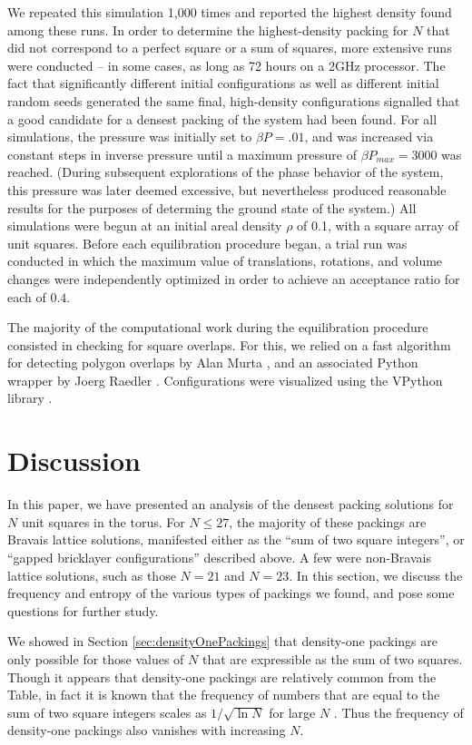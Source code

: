 \documentclass[aps]{revtex4}
\begin{document}
We repeated this simulation 1,000 times and reported the highest density found among these runs.  In order to determine the highest-density packing for $N$ that did not correspond to a perfect square or a sum of squares, more extensive runs were conducted -- in some cases, as long as 72 hours on a 2GHz processor.  The fact that significantly different initial configurations as well as different initial random seeds generated the same final, high-density configurations signalled that a good candidate for a densest packing of the system had been found.  For all simulations, the pressure was initially set to $\beta P=.01$, and was increased via constant steps in inverse pressure until a maximum pressure of $\beta P_{max}=3000$ was reached. (During subsequent explorations of the phase behavior of the system, this pressure was later deemed excessive, but nevertheless produced reasonable results for the purposes of determing the ground state of the system.) All simulations were begun at an initial areal density $\rho$ of 0.1, with a square array of unit squares. Before each equilibration procedure began, a trial run was conducted in which the maximum value of translations, rotations, and volume changes were independently optimized in order to achieve an acceptance ratio for each of $0.4$. 

The majority of the computational work during the equilibration procedure consisted in checking for square overlaps.  For this, we relied on a fast algorithm for detecting polygon overlaps by Alan Murta \cite{Murta}, and an associated Python wrapper by Joerg Raedler \cite{Radler}. Configurations were visualized using the VPython library \cite{Scherer2000}.


\section{Discussion}
\label{sec:discussion}

In this paper, we have presented an analysis of the densest packing solutions for $N$ unit squares in the torus.  For $N \leq 27$, the majority of these packings are Bravais lattice solutions, manifested either as the ``sum of two square integers'', or ``gapped bricklayer configurations'' described above. A few were non-Bravais lattice solutions, such as those $N=21$ and $N=23$. In this section, we discuss the frequency and entropy of the various types of packings we found, and pose some questions for further study.

We showed in Section \ref{sec:densityOnePackings} that density-one packings are only possible for those values of $N$ that are expressible as the sum of two squares. 
Though it appears that density-one packings are relatively common from the Table, in fact it is known that the frequency of numbers that are equal to the sum of two square integers scales as $1/\sqrt{\ln N}$ for large $N$ \cite{Berndt1993,Landau1909}.
Thus the frequency of density-one packings also vanishes with increasing $N$.
\end{document}

